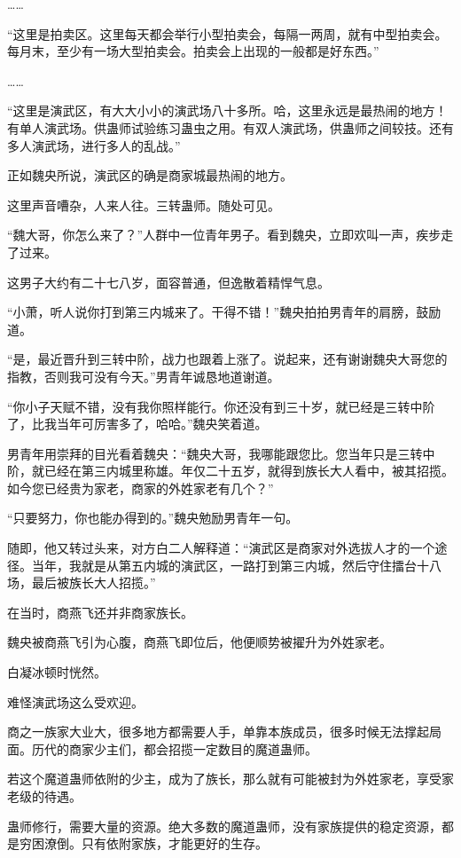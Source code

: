 \begin{this_body}
……

“这里是拍卖区。这里每天都会举行小型拍卖会，每隔一两周，就有中型拍卖会。每月末，至少有一场大型拍卖会。拍卖会上出现的一般都是好东西。”

……

“这里是演武区，有大大小小的演武场八十多所。哈，这里永远是最热闹的地方！有单人演武场。供蛊师试验练习蛊虫之用。有双人演武场，供蛊师之间较技。还有多人演武场，进行多人的乱战。”

正如魏央所说，演武区的确是商家城最热闹的地方。

这里声音嘈杂，人来人往。三转蛊师。随处可见。

“魏大哥，你怎么来了？”人群中一位青年男子。看到魏央，立即欢叫一声，疾步走了过来。

这男子大约有二十七八岁，面容普通，但逸散着精悍气息。

“小萧，听人说你打到第三内城来了。干得不错！”魏央拍拍男青年的肩膀，鼓励道。

“是，最近晋升到三转中阶，战力也跟着上涨了。说起来，还有谢谢魏央大哥您的指教，否则我可没有今天。”男青年诚恳地道谢道。

“你小子天赋不错，没有我你照样能行。你还没有到三十岁，就已经是三转中阶了，比我当年可厉害多了，哈哈。”魏央笑着道。

男青年用崇拜的目光看着魏央：“魏央大哥，我哪能跟您比。您当年只是三转中阶，就已经在第三内城里称雄。年仅二十五岁，就得到族长大人看中，被其招揽。如今您已经贵为家老，商家的外姓家老有几个？”

“只要努力，你也能办得到的。”魏央勉励男青年一句。

随即，他又转过头来，对方白二人解释道：“演武区是商家对外选拔人才的一个途径。当年，我就是从第五内城的演武区，一路打到第三内城，然后守住擂台十八场，最后被族长大人招揽。”

在当时，商燕飞还并非商家族长。

魏央被商燕飞引为心腹，商燕飞即位后，他便顺势被擢升为外姓家老。

白凝冰顿时恍然。

难怪演武场这么受欢迎。

商之一族家大业大，很多地方都需要人手，单靠本族成员，很多时候无法撑起局面。历代的商家少主们，都会招揽一定数目的魔道蛊师。

若这个魔道蛊师依附的少主，成为了族长，那么就有可能被封为外姓家老，享受家老级的待遇。

蛊师修行，需要大量的资源。绝大多数的魔道蛊师，没有家族提供的稳定资源，都是穷困潦倒。只有依附家族，才能更好的生存。


\end{this_body}
